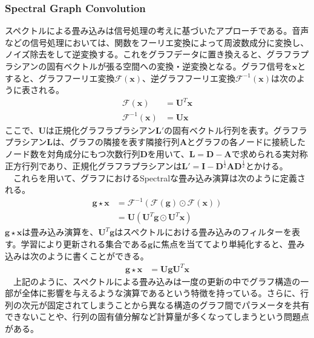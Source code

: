 \subsubsection{Spectral Graph Convolution}
スペクトルによる畳み込み\cite{gnnbook}は信号処理の考えに基づいたアプローチである。音声などの信号処理においては、関数をフーリエ変換によって周波数成分に変換し、ノイズ除去をして逆変換する。これをグラフデータに置き換えると、グラフラプラシアンの固有ベクトルが張る空間への変換・逆変換となる。グラフ信号を$\bm{x}$とすると、グラフフーリエ変換$\mathscr{F}(\bm{x})$、逆グラフフーリエ変換$\mathscr{F}^{-1}(\bm{x})$は次のように表される。
\begin{align}
\mathscr{F}(\bm{x}) &= \bm{U}^T\bm{x}\\
\mathscr{F}^{-1}(\bm{x}) &= \bm{U}\bm{x}
\end{align}
ここで、$\bm{U}$は正規化グラフラプラシアン$\bm{L}'$の固有ベクトル行列を表す。グラフラプラシアン$\bm{L}$は、グラフの隣接を表す隣接行列$\bm{A}$とグラフの各ノードに接続したノード数を対角成分にもつ次数行列$\bm{D}$を用いて、$\bm{L} = \bm{D}-  \bm{A}$で求められる実対称正方行列であり、正規化グラフラプラシアンは$\bm{L}' = \bm{I} - \bm{D}^{\frac{1}{2}} \bm{A} \bm{D}^{\frac{1}{2}}$とかける。\\
　これらを用いて、グラフにおけるSpectralな畳み込み演算は次のように定義される。
\begin{align}
\bm{g} \star \bm{x} &= \mathscr{F}^{-1}(\mathscr{F}(\bm{g}) \odot \mathscr{F}(\bm{x}))\\
&= \bm{U}(\bm{U}^T \bm{g} \odot \bm{U}^T \bm{x})
\end{align}
$\bm{g} \star \bm{x}$は畳み込み演算を、$\bm{U}^T \bm{g}$はスペクトルにおける畳み込みのフィルターを表す。学習により更新される集合である$\bm{g}$に焦点を当ててより単純化すると、畳み込みは次のように書くことができる。\\
\begin{align}
\bm{g} \star \bm{x} &= \bm{U} \bm{g} \bm{U}^T \bm{x}
\end{align}
　上記のように、スペクトルによる畳み込みは一度の更新の中でグラフ構造の一部が全体に影響を与えるような演算であるという特徴を持っている。さらに、行列の次元が固定されてしまうことから異なる構造のグラフ間でパラメータを共有できないことや、行列の固有値分解など計算量が多くなってしまうという問題点がある。
